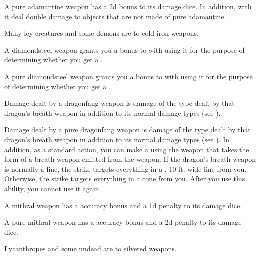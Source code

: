          A pure adamantine weapon has a \plus2d bonus to its damage dice.
        In addition,  with it deal double damage to objects that are not made of pure adamantine.

         Many fey creatures and some demons are  to cold iron weapons.

         A diamondsteel weapon grants you a  bonus to  with  using it for the purpose of determining whether you get a .

         A pure diamondsteel weapon grants you a  bonus to  with  using it for the purpose of determining whether you get a .

         Damage dealt by a dragonfang weapon is damage of the type dealt by that dragon's breath weapon in addition to its normal damage types (see ).

         Damage dealt by a pure dragonfang weapon is damage of the type dealt by that dragon's breath weapon in addition to its normal damage types (see ).
        In addition, as a standard action, you can make a  using the weapon that takes the form of a breath weapon emitted from the weapon.
        If the dragon's breath weapon is normally a line, the strike targets everything in a \arealarge, 10 ft. wide line from you.
        Otherwise, the strike targets everything in a \areamed cone from you.
        After you use this ability, you  cannot use it again.

         A mithral weapon has a  accuracy bonus and a \minus1d penalty to its damage dice.

         A pure mithral weapon has a  accuracy bonus and a \minus2d penalty to its damage dice.

         Lycanthropes and some undead are  to silvered weapons.

